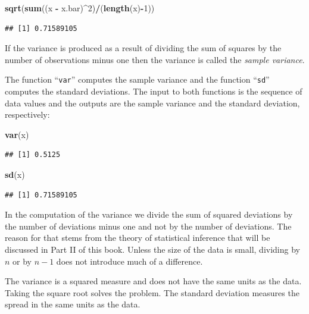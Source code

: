 \documentclass[]{krantz}
\makeatletter
\newenvironment{Shaded}{\begin{snugshade}}{\end{snugshade}}
\newcommand{\DecValTok}[1]{\textcolor[rgb]{0.00,0.00,0.81}{#1}}
\newcommand{\KeywordTok}[1]{\textcolor[rgb]{0.13,0.29,0.53}{\textbf{#1}}}
\newcommand{\NormalTok}[1]{#1}
\newcommand{\OperatorTok}[1]{\textcolor[rgb]{0.81,0.36,0.00}{\textbf{#1}}}
\newcommand{\StringTok}[1]{\textcolor[rgb]{0.31,0.60,0.02}{#1}}
\newenvironment{kframe}{%
\medskip{}
\setlength{\fboxsep}{.8em}
 \def\at@end@of@kframe{}%
 \ifinner\ifhmode%
  \def\at@end@of@kframe{\end{minipage}}%
  \begin{minipage}{\columnwidth}%
 \fi\fi%
 \def\FrameCommand##1{\hskip\@totalleftmargin \hskip-\fboxsep
 \colorbox{shadecolor}{##1}\hskip-\fboxsep
     \hskip-\linewidth \hskip-\@totalleftmargin \hskip\columnwidth}%
 \MakeFramed {\advance\hsize-\width
   \@totalleftmargin\z@ \linewidth\hsize
   \@setminipage}}%
 {\par\unskip\endMakeFramed%
 \at@end@of@kframe}
\renewenvironment{Shaded}{\begin{kframe}}{\end{kframe}}
\theoremstyle{definition}
\theoremstyle{definition}
\theoremstyle{definition}
\theoremstyle{remark}
\makeatother
\begin{document}
\begin{Shaded}
\begin{Highlighting}[]
\KeywordTok{sqrt}\NormalTok{(}\KeywordTok{sum}\NormalTok{((x }\OperatorTok{-}\StringTok{ }\NormalTok{x.bar)}\OperatorTok{^}\DecValTok{2}\NormalTok{)}\OperatorTok{/}\NormalTok{(}\KeywordTok{length}\NormalTok{(x)}\OperatorTok{-}\DecValTok{1}\NormalTok{))}
\end{Highlighting}
\end{Shaded}

\begin{verbatim}
## [1] 0.71589105
\end{verbatim}

If the variance is produced as a result of dividing the sum of squares
by the number of observations minus one then the variance is called the
\emph{sample variance}.

The function ``\texttt{var}'' computes the sample variance and the function
``\texttt{sd}'' computes the standard deviations. The input to both functions is
the sequence of data values and the outputs are the sample variance and
the standard deviation, respectively:

\begin{Shaded}
\begin{Highlighting}[]
\KeywordTok{var}\NormalTok{(x)}
\end{Highlighting}
\end{Shaded}

\begin{verbatim}
## [1] 0.5125
\end{verbatim}

\begin{Shaded}
\begin{Highlighting}[]
\KeywordTok{sd}\NormalTok{(x)}
\end{Highlighting}
\end{Shaded}

\begin{verbatim}
## [1] 0.71589105
\end{verbatim}

In the computation of the variance we divide the sum of squared
deviations by the number of deviations minus one and not by the number
of deviations. The reason for that stems from the theory of statistical
inference that will be discussed in Part II of this book. Unless the
size of the data is small, dividing by \(n\) or by \(n-1\) does not
introduce much of a difference.

The variance is a squared measure and does not have the same units as
the data. Taking the square root solves the problem. The standard
deviation measures the spread in the same units as the data.
\end{document}
